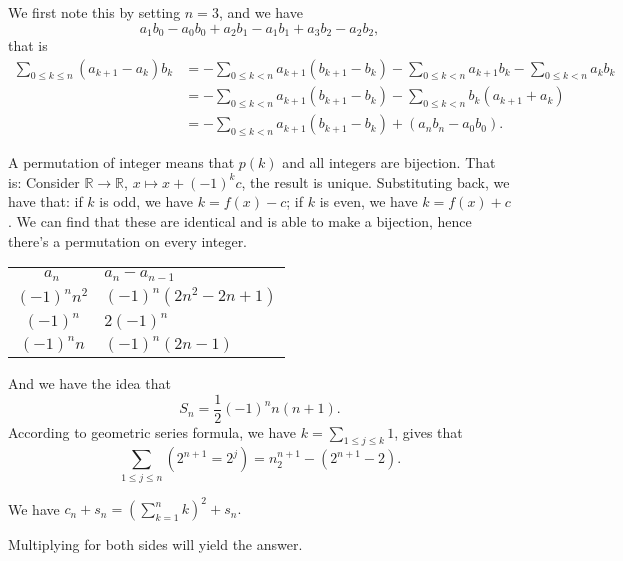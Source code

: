  We first note this by setting $n = 3$, and we have 
\[
    a_1b_0-a_0b_0+a_2b_1-a_1b_1+a_3b_2-a_2b_2,
\]
that is 
\begin{align*}
    \sum_{0\leq k\leq n}^{} (a_{k+1}-a_k)b_k &= 
    -\sum_{0\leq k<n}^{}a_{k+1} (b_{k+1}-b_k)-\sum_{0\leq k<n}^{} a_{k+1}b_k
    -\sum_{0\leq k<n}^{} a_kb_k\\
    &= -\sum_{0\leq k<n}^{}a_{k+1}(b_{k+1}-b_k) - 
      \sum_{0\leq k<n}^{} b_k (a_{k+1} + a_k)\\
    &=  -\sum_{0\leq k<n}^{}a_{k+1}(b_{k+1}-b_k) + (a_n b_n - a_0b_0). 
\end{align*}

 A permutation of integer means that $p(k)$ and all integers 
are bijection. That is: Consider $\mathbb R \to \mathbb R$, $x\mapsto x+(-1)^kc$, the result is 
unique. Substituting back, we have that: if $k$ is odd, we have $k=f(x)-c$; 
if $ k$ is even, we have $k=f(x)+c$. We can find that these are identical
and is able to make a bijection, hence there's a permutation on every
integer. 


\begin{tabular}{c|l}
    $a_n$ & $a_n-a_{n-1}$ \\
    $(-1)^nn^2$ & $(-1)^n(2n^2 -2n+1)$\\
    $(-1)^n$ & $2(-1)^n$ \\
    $(-1)^nn$ & $(-1)^n(2n-1)$
\end{tabular}

And we have the idea that 
\[
    S_n = \frac{1}{2}(-1)^n n(n+1). 
\]
 According to geometric series formula, we have 
$k=\sum_{1\leq j\leq k}^{}1$, gives that 
\[
    \sum_{1\leq j\leq n}^{}(2^{n+1} =2^j)=n_2^{n+1}-(2^{n+1}-2).
\]

 We have $c_n + s_n = \left(\sum_{k=1}^{n}k\right)^2+s_n.$

 Multiplying for both sides will yield the answer. 

